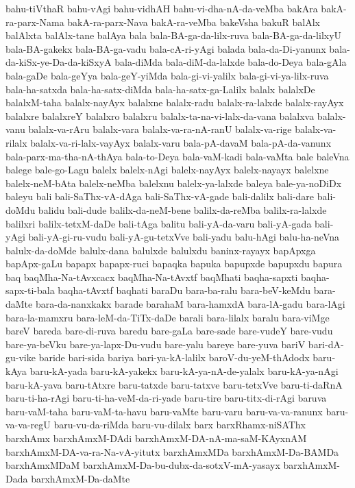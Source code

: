 {bahu-tiVthaR
bahu-vAgi
bahu-vidhAH
bahu-vi-dha-nA-da-veMba
bakAra
bakA-ra-parx-Nama
bakA-ra-parx-Nava
bakA-ra-veMba
bakeVsha
bakuR
balAlx
balAlxta
balAlx-tane
balAya
bala
bala-BA-ga-da-lilx-ruva
bala-BA-ga-da-lilxyU
bala-BA-gakekx
bala-BA-ga-vadu
bala-cA-ri-yAgi
balada
bala-da-Di-yanunx
bala-da-kiSx-ye-Da-da-kiSxyA
bala-diMda
bala-diM-da-lalxde
bala-do-Deya
bala-gAla
bala-gaDe
bala-geYya
bala-geY-yiMda
bala-gi-vi-yalilx
bala-gi-vi-ya-lilx-ruva
bala-ha-satxda
bala-ha-satx-diMda
bala-ha-satx-ga-Lalilx
balalx
balalxDe
balalxM-taha
balalx-nayAyx
balalxne
balalx-radu
balalx-ra-lalxde
balalx-rayAyx
balalxre
balalxreY
balalxro
balalxru
balalx-ta-na-vi-lalx-da-vana
balalxva
balalx-vanu
balalx-va-rAru
balalx-vara
balalx-va-ra-nA-ranU
balalx-va-rige
balalx-va-rilalx
balalx-va-ri-lalx-vayAyx
balalx-varu
bala-pA-davaM
bala-pA-da-vanunx
bala-parx-ma-tha-nA-thAya
bala-to-Deya
bala-vaM-kadi
bala-vaMta
bale
baleVna
balege
bale-go-Lagu
balelx
balelx-nAgi
balelx-nayAyx
balelx-nayayx
balelxne
balelx-neM-bAta
balelx-neMba
balelxnu
balelx-ya-lalxde
baleya
bale-ya-noDiDx
baleyu
bali
bali-SaThx-vA-dAga
bali-SaThx-vA-gade
bali-dalilx
bali-dare
bali-doMdu
balidu
bali-dude
balilx-da-neM-bene
balilx-da-reMba
balilx-ra-lalxde
balilxri
balilx-tetxM-daDe
bali-tAga
balitu
bali-yA-da-varu
bali-yA-gada
bali-yAgi
bali-yA-gi-ru-vudu
bali-yA-gu-tetxVve
bali-yadu
balu-hAgi
balu-ha-neVna
balulx-da-doMde
balulx-dana
balulxde
balulxdu
baninx-rayayx
bapApxga
bapApx-gaLu
bapapx
bapapx-ruci
bapaqka
bapuka
bapupxde
bapupxdu
bapura
baq
baqMha-Na-tAvxcacx
baqMha-Na-tAvxtf
baqMhati
baqha-sapxti
baqha-sapx-ti-bala
baqha-tAvxtf
baqhati
baraDu
bara-ba-ralu
bara-beV-keMdu
bara-daMte
bara-da-nanxkakx
barade
barahaM
bara-hamxdA
bara-lA-gadu
bara-lAgi
bara-la-mamxru
bara-leM-da-TiTx-daDe
barali
bara-lilalx
baralu
bara-viMge
bareV
bareda
bare-di-ruva
baredu
bare-gaLa
bare-sade
bare-vudeY
bare-vudu
bare-ya-beVku
bare-ya-lapx-Du-vudu
bare-yalu
bareye
bare-yuva
bariV
bari-dA-gu-vike
baride
bari-sida
bariya
bari-ya-kA-lalilx
baroV-du-yeM-thAdodx
baru-kAya
baru-kA-yada
baru-kA-yakekx
baru-kA-ya-nA-de-yalalx
baru-kA-ya-nAgi
baru-kA-yava
baru-tAtxre
baru-tatxde
baru-tatxve
baru-tetxVve
baru-ti-daRnA
baru-ti-ha-rAgi
baru-ti-ha-veM-da-ri-yade
baru-tire
baru-titx-di-rAgi
baruva
baru-vaM-taha
baru-vaM-ta-havu
baru-vaMte
baru-varu
baru-va-va-ranunx
baru-va-va-regU
baru-vu-da-riMda
baru-vu-dilalx
barx
barxRhamx-niSAThx
barxhAmx
barxhAmxM-DAdi
barxhAmxM-DA-nA-ma-saM-KAyxnAM
barxhAmxM-DA-va-ra-Na-vA-yitutx
barxhAmxMDa
barxhAmxM-Da-BAMDa
barxhAmxMDaM
barxhAmxM-Da-bu-dubx-da-sotxV-mA-yasayx
barxhAmxM-Dada
barxhAmxM-Da-daMte
}
